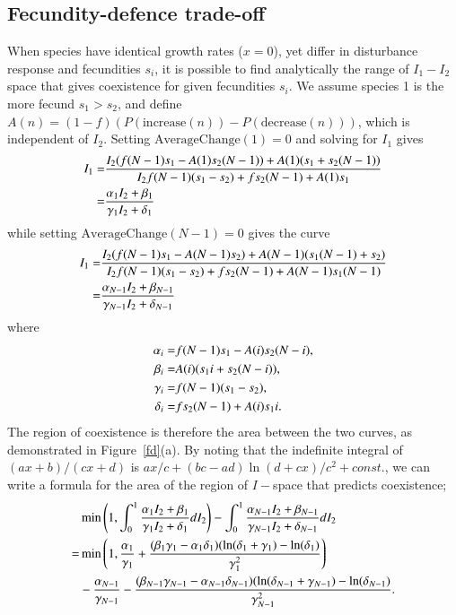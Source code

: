 \subsection{Fecundity-defence trade-off}
When species have identical growth rates ($x=0$), yet differ in disturbance response and fecundities $s_i$, it is possible to find analytically the range of $I_1 - I_2$ space that gives coexistence for given fecundities $s_i$. We assume species 1 is the more fecund $s_1>s_2$, and define $A(n)=(1-f)(P(\text{increase}(n))-P(\text{decrease}(n)))$, which is independent of $I_2$. Setting $\text{AverageChange}(1)=0$ and solving for $I_1$ gives
\begin{align}
\label{fdac1sol}
I_1=&\frac{I_2(f(N-1)s_1-A(1)s_2(N-1)) +A(1)(s_1+s_2(N-1))}{I_2f(N-1)(s_1-s_2) +fs_2(N-1) +A(1)s_1}\notag \\
=&\frac{\alpha_1 I_2 +\beta_1}{\gamma_1 I_2+\delta_1}
\end{align}
while setting $\text{AverageChange}(N-1)=0$ gives the curve
\begin{align}
\label{fdacnsol}
I_1=&\frac{I_2(f(N-1)s_1-A(N-1)s_2) +A(N-1)(s_1(N-1)+s_2)}{I_2f(N-1)(s_1-s_2) +fs_2(N-1) +A(N-1)s_1(N-1)}\notag \\
=&\frac{\alpha_{N-1} I_2 +\beta_{N-1}}{\gamma_{N-1} I_2+\delta_{N-1}}
\end{align}
where
\begin{align}
\alpha_i =& f(N-1)s_1 - A(i) s_2 (N-i), \notag \\
\beta_i =& A(i) (s_1 i + s_2(N-i)), \notag \\
\gamma_i =& f(N-1)(s_1-s_2), \notag \\
\delta_i =& fs_2(N-1) + A(i)s_1 i. \notag
\end{align}
The region of coexistence is therefore the area between the two curves, as demonstrated in Figure~\ref{fd}(a). By noting that the indefinite integral of $(a x +b)/(c x +d)$ is $ax/c+(bc-ad)\ln(d+cx)/c^2 +const.$, we can write a formula for the area of the region of $I-$space that predicts coexistence;
\begin{align}
&\min \left(1, \int_0^1 \frac{\alpha_1 I_2 +\beta_1}{\gamma_1 I_2+\delta_1} dI_2 \right) -  \int_0^1 \frac{\alpha_{N-1} I_2 +\beta_{N-1}}{\gamma_{N-1} I_2+\delta_{N-1}}dI_2  \notag \\
=&\min\left(1,\frac{\alpha_1}{\gamma_1}+\frac{(\beta_1 \gamma_1 - \alpha_1 \delta_1)(\ln(\delta_1 +\gamma_1)-\ln(\delta_1)}{\gamma_1^2}\right) \\
&-\frac{\alpha_{N-1}}{\gamma_{N-1}}-\frac{(\beta_{N-1} \gamma_{N-1} - \alpha_{N-1} \delta_{N-1})(\ln(\delta_{N-1} +\gamma_{N-1})-\ln(\delta_{N-1})}{\gamma_{N-1}^2}. \notag
\end{align}
